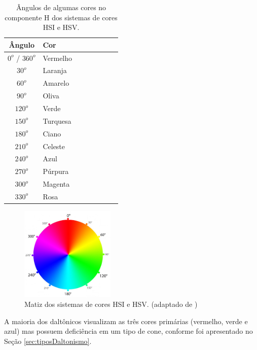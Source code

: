 \documentclass[	12pt, Times, openright, twoside, a4paper, english, brazil]{abntex2}
\begin{document}
\begin{table}[ht]
\centering
\begin{tabular}{clcccccc}
\hline      

\textbf{Ângulo}     & \textbf{Cor}  \\ \hline
$0^o$ / $360^o$     & Vermelho      \\ \hline
$30^o$              & Laranja       \\ \hline
$60^o$              & Amarelo       \\ \hline
$90^o$              & Oliva         \\ \hline
$120^o$             & Verde         \\ \hline
$150^o$             & Turquesa      \\ \hline
$180^o$             & Ciano         \\ \hline
$210^o$             & Celeste       \\ \hline
$240^o$             & Azul          \\ \hline
$270^o$             & Púrpura       \\ \hline
$300^o$             & Magenta       \\ \hline
$330^o$             & Rosa          \\ \hline

\end{tabular}
\caption{Ângulos de algumas cores no componente H dos sistemas de cores HSI e HSV.}
\label{tab:coresEmH}
\end{table}

\begin{figure}[!htb]
\centering \includegraphics[width=0.40\textwidth]{figuraColorsH.PNG}
\caption{Matiz dos sistemas de cores HSI e HSV. (adaptado de ) \label{fig:figuraColorsH}}
\end{figure}

A maioria dos daltônicos visualizam as três cores primárias (vermelho, verde e azul) mas possuem deficiência em um tipo de cone, conforme foi apresentado no Seção \ref{sec:tiposDaltonismo}. 
\end{document}
